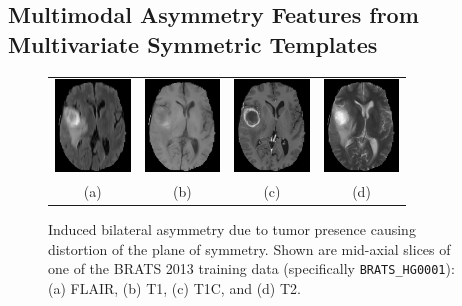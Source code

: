\documentclass[final,5p,times,twocolumn]{elsarticle}
\begin{document}
\subsection{Multimodal Asymmetry Features from Multivariate Symmetric Templates}

\setlength{\tabcolsep}{2pt}

\begin{figure}[htb]
  \centering
  \begin{tabular}{cccc}
  \includegraphics[width=20mm]{Figures/BRATS_HG0001/BRATS_HG0001_FLAIR_slice93.png} &
  \includegraphics[width=20mm]{Figures/BRATS_HG0001/BRATS_HG0001_T1_slice93.png} &
  \includegraphics[width=20mm]{Figures/BRATS_HG0001/BRATS_HG0001_T1C_slice93.png} &
  \includegraphics[width=20mm]{Figures/BRATS_HG0001/BRATS_HG0001_T2_slice93.png} \\
  (a) & (b) &
  (c) & (d) \\
  \end{tabular}
  \caption{Induced bilateral asymmetry due to tumor presence causing
  distortion of the plane of symmetry.  Shown are mid-axial slices of
  one of the BRATS 2013 training data 
  (specifically {\tt BRATS\_HG0001}):  (a) FLAIR, (b) T1, (c) T1C, and
  (d) T2.  }
  \label{fig:asymmetry}
\end{figure}

\setlength{\tabcolsep}{6pt}
\end{document}
